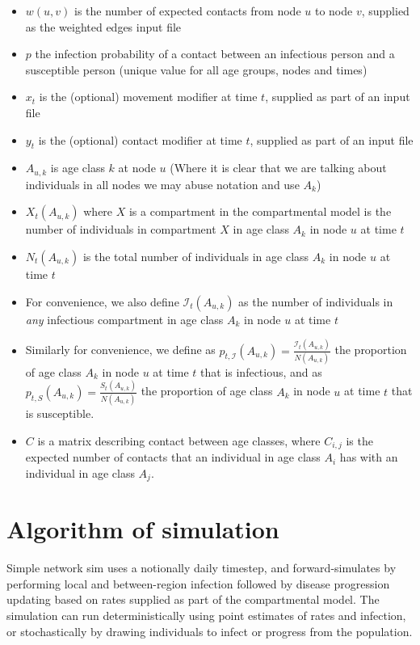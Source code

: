 \documentclass[11pt]{article}
\begin{document}
\begin{itemize}
\item $w(u, v)$ is the number of expected contacts from node $u$ to node $v$, supplied as the weighted edges input file
\item $p$ the infection probability of a contact between an infectious person and a susceptible person (unique value for all age groups, nodes and times)
\item $x_t$ is the (optional) movement modifier at time $t$, supplied as part of an input file
\item $y_t$ is the (optional) contact modifier at time $t$, supplied as part of an input file
\item $A_{u,k}$ is age class $k$ at node $u$ (Where it is clear that we are talking about individuals in all nodes we may abuse notation and use $A_k$)
\item $X_t(A_{u,k})$ where $X$ is a compartment in the compartmental model is the number of individuals in compartment $X$ in age class $A_k$ in node $u$ at time $t$
\item $N_t(A_{u,k})$ is the total number of individuals in age class $A_k$ in node $u$ at time $t$
\item For convenience, we also define $\mathcal{I}_t(A_{u,k})$ as the number of individuals in \emph{any} infectious compartment in age class $A_k$ in node $u$ at time $t$
\item Similarly for convenience, we define as $p_{t, \mathcal{I}}(A_{u,k}) = \frac{\mathcal{I}_t(A_{u,k})}{N(A_{u,k})}$ the proportion of age class $A_k$ in node $u$ at time $t$ that is infectious, and as $p_{t, S}(A_{u,k}) = \frac{S_t(A_{u,k})}{N(A_{u,k})}$ the proportion of age class $A_k$ in node $u$ at time $t$ that is susceptible.
\item $C$ is a matrix describing contact between age classes, where $C_{i,j}$ is the expected number of contacts that an individual in age class $A_i$ has with an individual in age class $A_j$.
\end{itemize}


\section{Algorithm of simulation}

Simple network sim uses a notionally daily timestep, and forward-simulates by performing local and between-region infection followed by disease progression updating based on rates supplied as part of the compartmental model.  The simulation can run deterministically using point estimates of rates and infection, or stochastically by drawing individuals to infect or progress from the population.  
\end{document}
